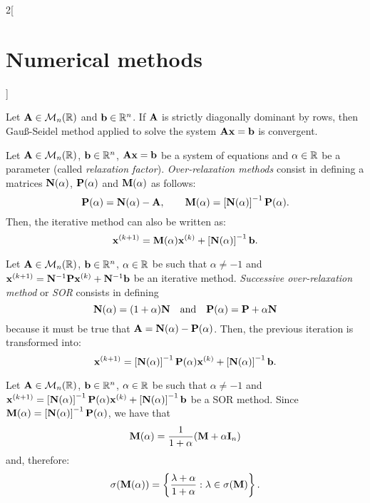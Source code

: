 \documentclass[../../../main.tex]{subfiles}
\begin{document}
\begin{multicols}{2}[\section{Numerical methods}]
\begin{definition}
\end{definition}
\begin{theorem}
    Let $\vb{A}\in\mathcal{M}_n(\mathbb{R})$ and $\vb{b}\in\mathbb{R}^n$. If $\vb{A}$ is strictly diagonally dominant by rows, then Gau\ss-Seidel method applied to solve the system $\vb{A}\vb{x}=\vb{b}$ is convergent.
\end{theorem}
\begin{definition}
    Let $\vb{A}\in\mathcal{M}_n(\mathbb{R})$, $\vb{b}\in\mathbb{R}^n$, $\vb{A}\vb{x}=\vb{b}$ be a system of equations and $\alpha\in\mathbb{R}$ be a parameter (called \textit{relaxation factor}). \textit{Over-relaxation methods} consist in defining a matrices $\vb{N}(\alpha)$, $\vb{P}(\alpha)$ and $\vb{M}(\alpha)$ as follows:
    $$\vb{P}(\alpha)=\vb{N}(\alpha)-\vb{A},\qquad\vb{M}(\alpha)=\left[\vb{N}(\alpha)\right]^{-1}\vb{P}(\alpha).$$
    Then, the iterative method can also be written as: $$\vb{x}^{(k+1)}=\vb{M}(\alpha)\vb{x}^{(k)}+\left[\vb{N}(\alpha)\right]^{-1}\vb{b}.$$
\end{definition}
\begin{definition}
    Let $\vb{A}\in\mathcal{M}_n(\mathbb{R})$, $\vb{b}\in\mathbb{R}^n$, $\alpha\in\mathbb{R}$ be such that $\alpha\ne-1$ and $\vb{x}^{(k+1)}=\vb{N}^{-1}\vb{P}\vb{x}^{(k)}+\vb{N}^{-1}\vb{b}$ be an iterative method. \textit{Successive over-relaxation method} or \textit{SOR} consists in defining $$\vb{N}(\alpha)=(1+\alpha)\vb{N}\quad\text{and}\quad\vb{P}(\alpha)=\vb{P}+\alpha\vb{N}$$ because it must be true that $\vb{A}=\vb{N}(\alpha)-\vb{P}(\alpha)$. Then, the previous iteration is transformed into: $$\vb{x}^{(k+1)}=\left[\vb{N}(\alpha)\right]^{-1}\vb{P}(\alpha)\vb{x}^{(k)}+\left[\vb{N}(\alpha)\right]^{-1}\vb{b}.$$
\end{definition}
\begin{definition}
    Let $\vb{A}\in\mathcal{M}_n(\mathbb{R})$, $\vb{b}\in\mathbb{R}^n$, $\alpha\in\mathbb{R}$ be such that $\alpha\ne-1$ and $\vb{x}^{(k+1)}=\left[\vb{N}(\alpha)\right]^{-1}\vb{P}(\alpha)\vb{x}^{(k)}+\left[\vb{N}(\alpha)\right]^{-1}\vb{b}$ be a SOR method. Since $\vb{M}(\alpha)=\left[\vb{N}(\alpha)\right]^{-1}\vb{P}(\alpha)$, we have that $$\vb{M}(\alpha)=\frac{1}{1+\alpha}(\vb{M}+\alpha\vb{I}_n)$$ and, therefore: $$\sigma(\vb{M}(\alpha))=\left\{\frac{\lambda+\alpha}{1+\alpha}:\lambda\in\sigma(\vb{M})\right\}.$$  

\end{definition}
\end{multicols}
\end{document}
